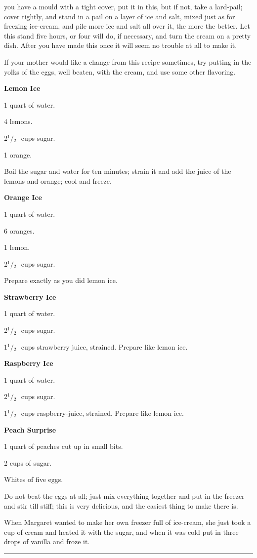 \documentclass[11pt]{book}
\newcommand{\hstroke}{\rule[0.5ex]{5.0em}{0.2ex}}
\newcommand{\indpar}{\par\noindent\hspace*{\parindent}}
\newcommand{\ingredient}{\indpar}
\newcommand{\instruction}{\indpar}
\newcommand{\OneHalf}{\ensuremath{{}^1\!\!/\!{}_2\mbox{\ }}}
\newenvironment{RecipeTitle}{\medskip\begin{center}\large\bf }{\end{center}\smallskip}
\begin{document}
you have a mould with a tight cover, put it in this, but if
not, take a lard-pail; cover tightly, and stand in a pail on a
layer of ice and salt, mixed just as for freezing ice-cream,
and pile more ice and salt all over it, the more the better.
Let this stand five hours, or four will do, if necessary, and
turn the cream on a pretty dish.  After you have made this
once it will seem no trouble at all to make it.
\instruction  If your mother would like a change from this recipe
sometimes, try putting in the yolks of the eggs, well beaten,
with the cream, and use some other flavoring.\pagebreak[4]
\begin{RecipeTitle}
Lemon Ice\label{lemon_ice}
\end{RecipeTitle}
\ingredient  1 quart of water.
\ingredient  4 lemons.
\ingredient  2\OneHalf cups sugar.
\ingredient  1 orange.
\instruction  Boil the sugar and water for ten minutes; strain it and add
the juice of the lemons and orange; cool and freeze.
\begin{RecipeTitle}
Orange Ice\label{orange_ice}
\end{RecipeTitle}
\ingredient  1 quart of water.
\ingredient  6 oranges.
\ingredient  1 lemon.
\ingredient  2\OneHalf cups sugar.
\instruction  Prepare exactly as you did lemon ice.
\begin{RecipeTitle}
Strawberry Ice\label{strawberry_ice}
\end{RecipeTitle}
\ingredient  1 quart of water.
\ingredient  2\OneHalf cups sugar.
\ingredient  1\OneHalf cups strawberry juice, strained.  Prepare like lemon
ice.\pagebreak[4]
\begin{RecipeTitle}
Raspberry Ice\label{raspberry_ice}
\end{RecipeTitle}
\ingredient  1 quart of water.
\ingredient  2\OneHalf cups sugar.
\ingredient  1\OneHalf cups raspberry-juice, strained.  Prepare like lemon
ice.
\begin{RecipeTitle}
Peach Surprise\label{peach_surprise}
\end{RecipeTitle}
\ingredient  1 quart of peaches cut up in small bits.
\ingredient  2 cups of sugar.
\ingredient  Whites of five eggs.
\instruction  Do not beat the eggs at all; just mix everything together and
put in the freezer and stir till stiff; this is very
delicious, and the easiest thing to make there is.
\smallskip
\indpar
  When Margaret wanted to make her own freezer full of
ice-cream, she just took a cup of cream and heated it with the
sugar, and when it was cold put in three drops of vanilla and
froze it.
\begin{center}
\hstroke
\end{center}\pagebreak[4]
\end{document}
